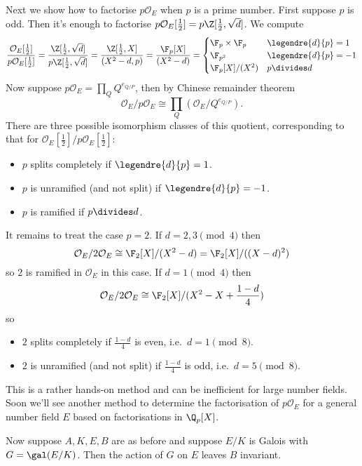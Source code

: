 \documentclass[a4paper]{article}
\renewcommand*{\O}{\mathcal{O}}
\begin{document}
\begin{eg}
  Next we show how to factorise \(p \O_E\) when \(p\) is a prime number. First suppose \(p\) is odd. Then it's enough to factorise \(p\O_E[\frac{1}{2}] = p\Z[\frac{1}{2}, \sqrt d]\). We compute
  \[
    \frac{\O_E[\frac{1}{2}]}{p \O_E[\frac{1}{2}]}
    = \frac{\Z[\frac{1}{2}, \sqrt d]}{p \Z[\frac{1}{2}, \sqrt d]}
    = \frac{\Z[\frac{1}{2}, X]}{(X^2 - d, p)}
    = \frac{\F_p[X]}{(X^2 - d)}
    =
    \begin{cases}
      \F_ p \times \F_p & \legendre{d}{p} = 1 \\
      \F_{p^2} & \legendre{d}{p} = -1 \\
      \F_p[X]/(X^2) & p \divides d
    \end{cases}
  \]
  Now suppose \(p \O_E = \prod_Q Q^{e_{Q/P}}\), then by Chinese remainder theorem
  \[
    \O_E/p\O_E \cong \prod_Q (\O_E/Q^{e_{Q/P}}).
  \]
  There are three possible isomorphism classes of this quotient, corresponding to that for \(\O_E[\frac{1}{2}]/p\O_E[\frac{1}{2}]\):
  \begin{itemize}
  \item \(p\) splits completely if \(\legendre{d}{p} = 1\).
  \item \(p\) is unramified (and not split) if \(\legendre{d}{p} = -1\).
  \item \(p\) is ramified if \(p \divides d\).
  \end{itemize}

  It remains to treat the case \(p = 2\). If \(d = 2, 3 \pmod 4\) then
  \[
    \O_E/2\O_E \cong \F_2[X]/(X^2 - d) = \F_2[X]/((X - d)^2)
  \]
  so \(2\) is ramified in \(\O_E\) in this case. If \(d = 1 \pmod 4\) then
  \[
    \O_E/2\O_E \cong \F_2[X]/(X^2 - X + \frac{1 - d}{4})
  \]
  so
  \begin{itemize}
  \item \(2\) splits completely if \(\frac{1 - d}{4}\) is even, i.e.\ \(d = 1 \pmod 8\).
  \item \(2\) is unramified (and not split) if \(\frac{1 - d}{4}\) is odd, i.e.\ \(d = 5 \pmod 8\).
  \end{itemize}

  This is a rather hands-on method and can be inefficient for large number fields. Soon we'll see another method to determine the factorisation of \(p \O_E\) for a general number field \(E\) based on factorisations in \(\Q_p[X]\).
\end{eg}

Now suppose \(A, K, E, B\) are as before and suppose \(E/K\) is Galois with \(G = \gal(E/K)\). Then the action of \(G\) on \(E\) leaves \(B\) invariant.
\end{document}
